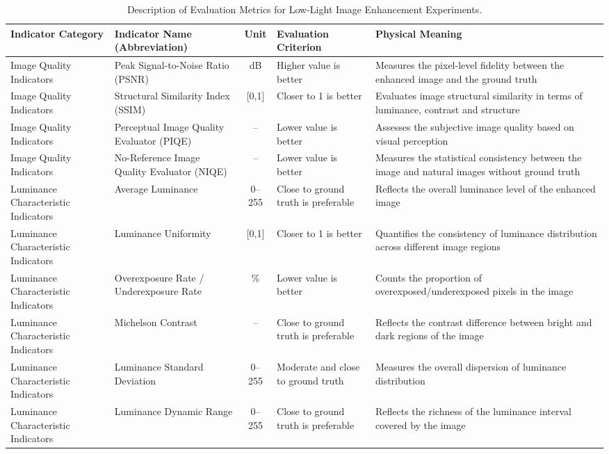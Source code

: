 \documentclass[sensors,article,submit,moreauthors]{Definitions/mdpi}
\begin{document}
\begin{table}[H]
\small
\caption{Description of Evaluation Metrics for Low-Light Image Enhancement Experiments.\label{tab1}}
\begin{tabularx}{\textwidth}{LLCLL}
\toprule
\textbf{Indicator Category}	& \textbf{Indicator Name (Abbreviation)}	& \textbf{Unit}	& \textbf{Evaluation Criterion}	& \textbf{Physical Meaning}\\
\midrule
Image Quality Indicators	& Peak Signal-to-Noise Ratio (PSNR)	& dB	& Higher value is better	& Measures the pixel-level fidelity between the enhanced image and the ground truth\\
Image Quality Indicators	& Structural Similarity Index (SSIM)	& [0,1]	& Closer to 1 is better	& Evaluates image structural similarity in terms of luminance, contrast and structure\\
Image Quality Indicators	& Perceptual Image Quality Evaluator (PIQE)	& --	& Lower value is better	& Assesses the subjective image quality based on visual perception\\
Image Quality Indicators	& No-Reference Image Quality Evaluator (NIQE)	& --	& Lower value is better	& Measures the statistical consistency between the image and natural images without ground truth\\
Luminance Characteristic Indicators	& Average Luminance	& 0--255	& Close to ground truth is preferable	& Reflects the overall luminance level of the enhanced image\\
Luminance Characteristic Indicators	& Luminance Uniformity	& [0,1]	& Closer to 1 is better	& Quantifies the consistency of luminance distribution across different image regions\\
Luminance Characteristic Indicators	& Overexposure Rate / Underexposure Rate	& \%	& Lower value is better	& Counts the proportion of overexposed/underexposed pixels in the image\\
Luminance Characteristic Indicators	& Michelson Contrast	& --	& Close to ground truth is preferable	& Reflects the contrast difference between bright and dark regions of the image\\
Luminance Characteristic Indicators	& Luminance Standard Deviation	& 0--255	& Moderate and close to ground truth	& Measures the overall dispersion of luminance distribution\\
Luminance Characteristic Indicators	& Luminance Dynamic Range	& 0--255	& Close to ground truth is preferable	& Reflects the richness of the luminance interval covered by the image\\

\end{tabularx}
\end{table}
\end{document}
